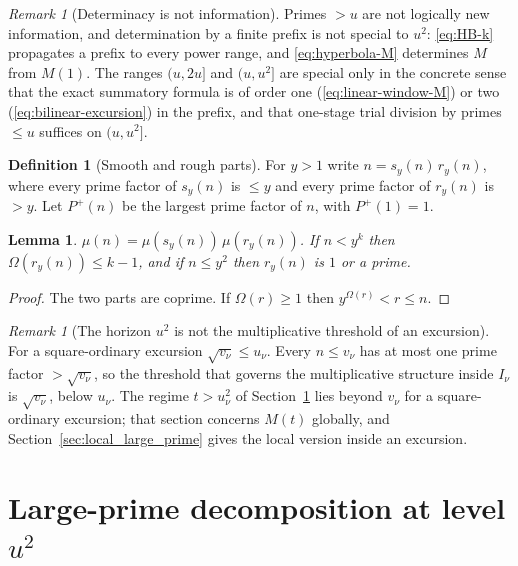 \documentclass[11pt]{amsart}
\numberwithin{equation}{section}
\theoremstyle{plain}
\newtheorem{lemma}[theorem]{Lemma}
\theoremstyle{definition}
\newtheorem{definition}[theorem]{Definition}
\theoremstyle{remark}
\newtheorem{remark}[theorem]{Remark}
\newcommand{\Pp}{P^{+}}
\begin{document}
\begin{remark}[Determinacy is not information]
\label{rem:information}
\label{warn:information_language}
Primes $>u$ are not logically new information, and determination by a
finite prefix is not special to $u^2$: \eqref{eq:HB-k} propagates a prefix
to every power range, and \eqref{eq:hyperbola-M} determines $M$ from $M(1)$.
The ranges $(u,2u]$ and $(u,u^2]$ are special only in the concrete sense
that the exact summatory formula is of order one
(\eqref{eq:linear-window-M}) or two (\eqref{eq:bilinear-excursion}) in the
prefix, and that one-stage trial division by primes $\le u$ suffices on
$(u,u^2]$.
\end{remark}

\begin{definition}[Smooth and rough parts]
\label{def:smooth_rough}
For $y>1$ write $n=s_y(n)\,r_y(n)$, where every prime factor of $s_y(n)$
is $\le y$ and every prime factor of $r_y(n)$ is $>y$. Let $\Pp(n)$ be the
largest prime factor of $n$, with $\Pp(1)=1$.
\end{definition}

\begin{lemma}
\label{lem:rough_part}
$\mu(n)=\mu(s_y(n))\,\mu(r_y(n))$. If $n<y^k$ then $\Omega(r_y(n))\le k-1$,
and if $n\le y^2$ then $r_y(n)$ is $1$ or a prime.
\end{lemma}

\begin{proof}
The two parts are coprime. If $\Omega(r)\ge1$ then $y^{\Omega(r)}<r\le n$.
\end{proof}

\begin{remark}[The horizon $u^2$ is not the multiplicative threshold of an excursion]
\label{rem:horizon_inactive}
For a square-ordinary excursion $\sqrt{v_\nu}\le u_\nu$. Every $n\le v_\nu$
has at most one prime factor $>\sqrt{v_\nu}$, so the threshold that governs
the multiplicative structure inside $I_\nu$ is $\sqrt{v_\nu}$, below
$u_\nu$. The regime $t>u_\nu^2$ of Section~\ref{sec:prime_copy_propagation}
lies beyond $v_\nu$ for a square-ordinary excursion; that section concerns
$M(t)$ globally, and Section~\ref{sec:local_large_prime} gives the local
version inside an excursion.
\end{remark}

\section{Large-prime decomposition at level \texorpdfstring{$u^2$}{u^2}}
\label{sec:prime_copy_propagation}
\end{document}
